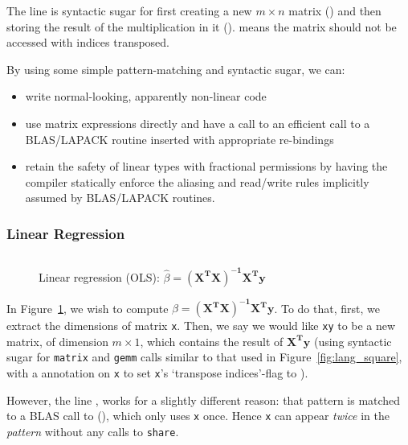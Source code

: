 The line  is syntactic sugar for
first creating a new $m \times n$ matrix () and
then storing the result of the multiplication in it ().  means
the matrix should not be accessed with indices transposed.

By using some simple pattern-matching and syntactic sugar, we can:
\begin{itemize}
    \item write normal-looking, apparently non-linear code
    \item use matrix expressions directly and have a call to an efficient
        call to a BLAS/LAPACK routine inserted with appropriate re-bindings
    \item retain the safety of linear types with fractional permissions by
        having the compiler statically enforce the aliasing and read/write rules
        implicitly assumed by BLAS/LAPACK routines.
\end{itemize}

\subsubsection{Linear Regression}

\begin{figure}[t]
    \centering
    \inputminted[fontsize=\small]{ocaml}{../../examples/lin_reg.lt}
    \caption{Linear regression (OLS): $\hat\beta =
        \mathbf{(X^T X)^{-1} X^T y}$}\label{fig:lang_lin_reg}
\end{figure}

In Figure~\ref{fig:lang_lin_reg}, we wish to compute $\hat\beta = \mathbf{(X^T
X)^{-1} X^T y}$. To do that, first, we extract the dimensions of matrix
\texttt{x}. Then, we say we would like \texttt{xy} to be a new matrix, of
dimension $m \times 1$, which contains the result of $\mathbf{X^T y}$ (using
syntactic sugar for \texttt{matrix} and \texttt{gemm} calls similar to that
used in Figure~\ref{fig:lang_square}, with a  annotation on
\texttt{x} to set \texttt{x}'s `transpose indices'-flag to ).

However, the line , works for a
slightly different reason: that pattern is matched to a BLAS call to
(), which only uses \texttt{x} once. Hence
\texttt{x} can appear \emph{twice} in the \emph{pattern} without any calls to
\texttt{share}.


